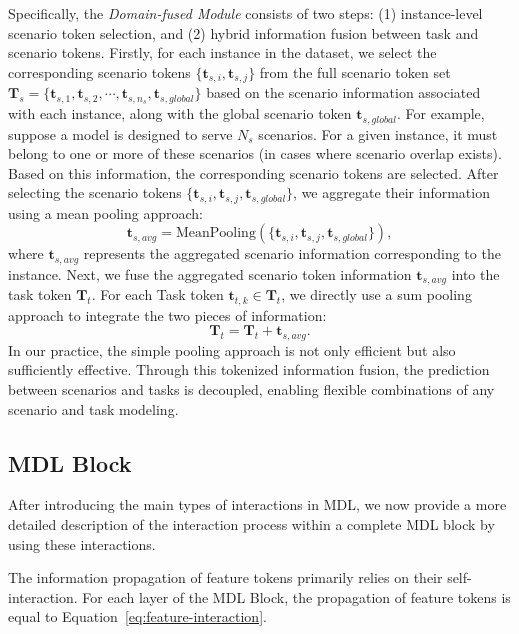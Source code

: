 Specifically, the \emph{Domain-fused Module} consists of two steps: (1) instance-level scenario token selection, and (2) hybrid information fusion between task and scenario tokens.
Firstly, for each instance in the dataset, we select the corresponding scenario tokens $\{{\bm{t}_{s,i}, \bm{t}_{s,j}}\}$ from the full scenario token set $\bm{T}_s = \{\bm{t}_{s,1}, \bm{t}_{s,2}, \cdots, \bm{t}_{s,{n_s}}, \bm{t}_{s, global}\}$ based on the scenario information associated with each instance, along with the global scenario token $\bm{t}_{s, global}$.
For example, suppose a model is designed to serve $N_{s}$ scenarios. 
For a given instance, it must belong to one or more of these scenarios (in cases where scenario overlap exists). 
Based on this information, the corresponding scenario tokens are selected. 
After selecting the scenario tokens $\{{\bm{t}_{s,i}, \bm{t}_{s,j}}, \bm{t}_{s,global}\}$, we aggregate their information using a mean pooling approach:
\begin{equation}
\label{eq-df1}
    \bm{t}_{s, avg} = \text{MeanPooling}(\{\bm{t}_{s,i}, \bm{t}_{s,j},\bm{t}_{s,global}\}),
\end{equation}
where $\bm{t}_{s, avg}$ represents the aggregated scenario information corresponding to the instance.
Next, we fuse the aggregated scenario token information $\bm{t}_{s, avg}$ into the task token $\bm{T}_{t}$.
For each Task token $\bm{t}_{t,k} \in \bm{T}_{t}$, we directly use a sum pooling approach to integrate the two pieces of information:
\begin{equation}
\label{eq-df2}
    \bm{T}_{t} = \bm{T}_{t} + \bm{t}_{s,avg}.
\end{equation}
In our practice, the simple pooling approach is not only efficient but also sufficiently effective.
Through this tokenized information fusion, the prediction between scenarios and tasks is decoupled, enabling flexible combinations of any scenario and task modeling.

\subsection{MDL Block}
After introducing the main types of interactions in MDL, we now provide a more detailed description of the interaction process within a complete MDL block by using these interactions.

The information propagation of feature tokens primarily relies on their self-interaction.
For each layer of the MDL Block, the propagation of feature tokens is equal to Equation~\ref{eq:feature-interaction}.

